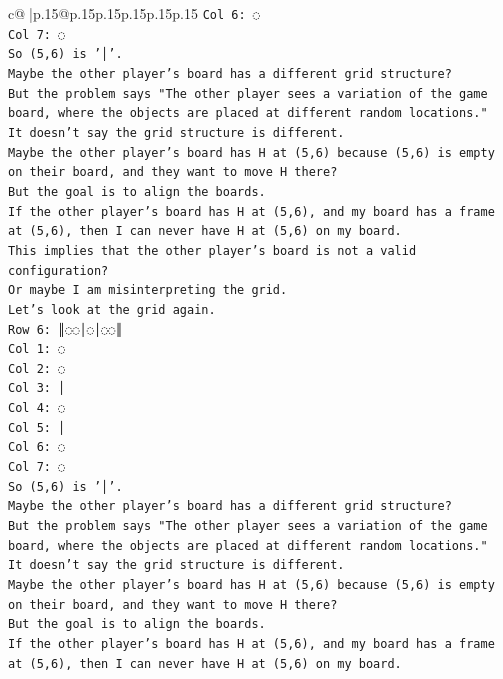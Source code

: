 \documentclass{article}
\begin{document}
{\begin{supertabular}{c@{$\;$}|p{.15\linewidth}@{}p{.15\linewidth}p{.15\linewidth}p{.15\linewidth}p{.15\linewidth}p{.15\linewidth}}
{{{\texttt{Col 6: ◌} \\
\texttt{Col 7: ◌} \\
\texttt{So (5,6) is '│'.} \\
\texttt{Maybe the other player's board has a different grid structure?} \\
\texttt{But the problem says "The other player sees a variation of the game board, where the objects are placed at different random locations."} \\
\texttt{It doesn't say the grid structure is different.} \\
\texttt{Maybe the other player's board has H at (5,6) because (5,6) is empty on their board, and they want to move H there?} \\
\texttt{But the goal is to align the boards.} \\
\texttt{If the other player's board has H at (5,6), and my board has a frame at (5,6), then I can never have H at (5,6) on my board.} \\
\texttt{This implies that the other player's board is not a valid configuration?} \\
\texttt{Or maybe I am misinterpreting the grid.} \\
\texttt{Let's look at the grid again.} \\
\texttt{Row 6: ║◌◌│◌│◌◌║} \\
\texttt{Col 1: ◌} \\
\texttt{Col 2: ◌} \\
\texttt{Col 3: │} \\
\texttt{Col 4: ◌} \\
\texttt{Col 5: │} \\
\texttt{Col 6: ◌} \\
\texttt{Col 7: ◌} \\
\texttt{So (5,6) is '│'.} \\
\texttt{Maybe the other player's board has a different grid structure?} \\
\texttt{But the problem says "The other player sees a variation of the game board, where the objects are placed at different random locations."} \\
\texttt{It doesn't say the grid structure is different.} \\
\texttt{Maybe the other player's board has H at (5,6) because (5,6) is empty on their board, and they want to move H there?} \\
\texttt{But the goal is to align the boards.} \\
\texttt{If the other player's board has H at (5,6), and my board has a frame at (5,6), then I can never have H at (5,6) on my board.} \\
}}}
\end{supertabular}}
\end{document}

